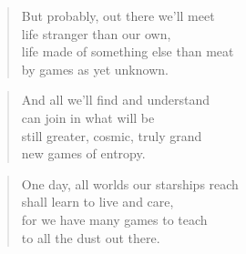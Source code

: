 \documentclass[10pt,a4paper]{article}
\begin{document}
\begin{multicols}{2}
\begin{verse}
But probably, out there we’ll meet\\
life stranger than our own,\\
life made of something else than meat\\
by games as yet unknown.
\end{verse}

\begin{verse}
And all we’ll find and understand\\
can join in what will be\\
still greater, cosmic, truly grand\\
new games of entropy.
\end{verse}

\begin{verse}
One day, all worlds our starships reach\\
shall learn to live and care,\\
for we have many games to teach\\
to all the dust out there.
\end{verse}

\end{multicols}
\end{document}
